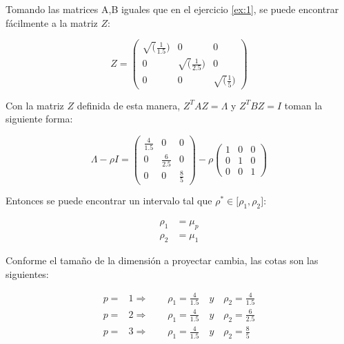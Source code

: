 \begin{example} \label{ex:2}
Tomando las matrices A,B iguales que en el ejercicio \ref{ex:1}, se puede encontrar fácilmente a la matriz $Z$:


\begin{equation*}
Z = \left(\!
    \begin{array}{ccc}
      \sqrt(\frac{1}{1.5}) & 0 & 0 \\
      0 & \sqrt(\frac{1}{2.5}) & 0 \\
      0 & 0 & \sqrt(\frac{1}{5}) 
    \end{array}
  \!\right)
\end{equation*}

Con la matriz $Z$ definida de esta manera, $Z^T A  Z = \Lambda$ y $Z^T B Z = I$ toman la siguiente forma:

\begin{equation*}
\Lambda - \rho I = 
\left(\!
    \begin{array}{ccc}
      \frac{4}{1.5} & 0  & 0\\
      0 & \frac{6}{2.5}  & 0\\
      0 & 0 & \frac{8}{5}
    \end{array}
  \!\right) - \rho
  \left(\!
    \begin{array}{ccc}
      1 & 0 & 0\\
      0 & 1 & 0\\
      0 & 0 & 1
    \end{array}
  \!\right) 
\end{equation*}

Entonces se puede encontrar un intervalo tal que $\rho^* \in \big[\rho_1, \rho_2 \big]$:

\begin{equation*}
  \begin{aligned}
\rho_1 &= \mu_p \\
\rho_2 &= \mu_1  
  \end{aligned}
\end{equation*}

Conforme el tamaño de la dimensión a proyectar cambia, las cotas son las siguientes:

\begin{equation*}
  \begin{aligned}
  p =& 1 \Rightarrow \qquad \rho_1 = \frac{4}{1.5} \quad y \quad \rho_2 = \frac{4}{1.5}\\
  p =& 2 \Rightarrow \qquad \rho_1 = \frac{4}{1.5} \quad y \quad \rho_2 = \frac{6}{2.5} \\
  p =& 3 \Rightarrow \qquad \rho_1 = \frac{4}{1.5} \quad y \quad \rho_2 = \frac{8}{5}
  \end{aligned}
\end{equation*}
 


\end{example}
